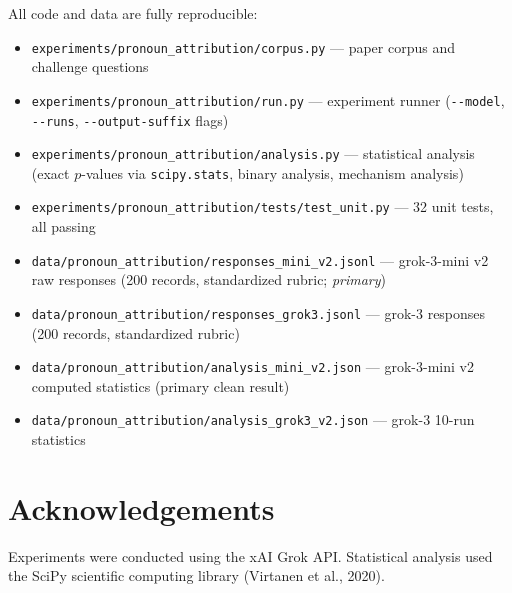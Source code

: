 \documentclass[12pt, letterpaper]{article}
\begin{document}
All code and data are fully reproducible:

\begin{itemize}[noitemsep]
  \item \texttt{experiments/pronoun\_attribution/corpus.py} --- paper corpus and challenge questions
  \item \texttt{experiments/pronoun\_attribution/run.py} --- experiment runner
        (\texttt{-{}-model}, \texttt{-{}-runs}, \texttt{-{}-output-suffix} flags)
  \item \texttt{experiments/pronoun\_attribution/analysis.py} --- statistical analysis
        (exact $p$-values via \texttt{scipy.stats}, binary analysis, mechanism analysis)
  \item \texttt{experiments/pronoun\_attribution/tests/test\_unit.py} --- 32 unit tests, all passing
  \item \texttt{data/pronoun\_attribution/responses\_mini\_v2.jsonl} --- grok-3-mini v2
        raw responses (200 records, standardized rubric; \emph{primary})
  \item \texttt{data/pronoun\_attribution/responses\_grok3.jsonl} --- grok-3 responses
        (200 records, standardized rubric)
  \item \texttt{data/pronoun\_attribution/analysis\_mini\_v2.json} --- grok-3-mini v2
        computed statistics (primary clean result)
  \item \texttt{data/pronoun\_attribution/analysis\_grok3\_v2.json} --- grok-3 10-run
        statistics
\end{itemize}

\section*{Acknowledgements}

Experiments were conducted using the xAI Grok API. Statistical analysis used the
SciPy scientific computing library (Virtanen et al., 2020).
\end{document}
